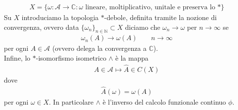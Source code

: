 \documentclass{article}
\numberwithin{equation}{subsection}
\begin{document}
\begin{align*}
    X = \{\omega : \mathscr{A} \longrightarrow \mathbb{C} : \omega \text{ lineare, moltiplicativo, unitale e preserva lo } *\}
\end{align*}
Su $X$ introduciamo la topologia $*$-debole, definita tramite la nozione di convergenza, ovvero data $\{\omega_n\}_{n \in \mathbb{N}} \subset X$ diciamo che $\omega_n \rightarrow \omega$ per $n \rightarrow \infty$ se 
\begin{align*}
    \omega_n(A) \rightarrow \omega(A) \qquad n \rightarrow \infty
\end{align*}
per ogni $A \in \mathscr{A}$ (ovvero delega la convergenza a $\mathbb{C}$). \\
Infine, lo $*$-isomorfismo isometrico $\wedge$ è la mappa
\begin{align*}
    A \in \mathscr{A} \mapsto \hat{A} \in C(X)
\end{align*}
dove 
\begin{align*}
    \hat{A}(\omega) = \omega(A)
\end{align*}
per ogni $\omega \in X$. In particolare $\wedge$ è l'inverso del calcolo funzionale continuo $\phi$. \\
\end{document}
